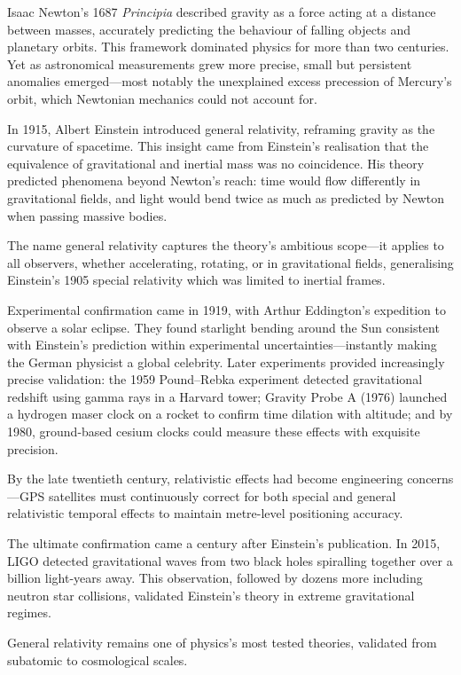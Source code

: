 \begin{historical}
Isaac Newton's 1687 \textit{Principia} described gravity as a force acting at a distance between masses, accurately predicting the behaviour of falling objects and planetary orbits. This framework dominated physics for more than two centuries. Yet as astronomical measurements grew more precise, small but persistent anomalies emerged—most notably the unexplained excess precession of Mercury's orbit, which Newtonian mechanics could not account for.

In 1915, Albert Einstein introduced general relativity, reframing gravity as the curvature of spacetime. This insight came from Einstein's realisation that the equivalence of gravitational and inertial mass was no coincidence. His theory predicted phenomena beyond Newton's reach: time would flow differently in gravitational fields, and light would bend twice as much as predicted by Newton when passing massive bodies.

The name \QSOpen{}general\QSClose{} relativity captures the theory's ambitious scope—it applies to all observers, whether accelerating, rotating, or in gravitational fields, generalising Einstein's 1905 special relativity which was limited to inertial frames.

Experimental confirmation came in 1919, with Arthur Eddington's expedition to observe a solar eclipse. They found starlight bending around the Sun consistent with Einstein's prediction within experimental uncertainties—instantly making the German physicist a global celebrity. Later experiments provided increasingly precise validation: the 1959 Pound–Rebka experiment detected gravitational redshift using gamma rays in a Harvard tower; Gravity Probe A (1976) launched a hydrogen maser clock on a rocket to confirm time dilation with altitude; and by 1980, ground-based cesium clocks could measure these effects with exquisite precision.

By the late twentieth century, relativistic effects had become engineering concerns—GPS satellites must continuously correct for both special and general relativistic temporal effects to maintain metre-level positioning accuracy.

The ultimate confirmation came a century after Einstein's publication. In 2015, LIGO detected gravitational waves from two black holes spiralling together over a billion light-years away. This observation, followed by dozens more including neutron star collisions, validated Einstein's theory in extreme gravitational regimes.

General relativity remains one of physics's most tested theories, validated from subatomic to cosmological scales.
\end{historical}
